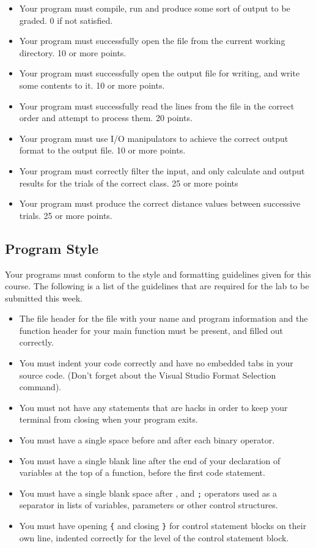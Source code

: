 \documentclass[11pt]{article}
\begin{document}
\begin{itemize}
\item Your program must compile, run and produce some sort of output to be
  graded. 0 if not satisfied.
\item Your program must successfully open the file from the current
  working directory. 10 or more points.
\item Your program must successfully open the output file for writing, and
  write some contents to it.  10 or more points.
\item Your program must successfully read the lines from the file in the
  correct order and attempt to process them. 20 points.
\item Your program must use I/O manipulators to achieve the correct output
  format to the output file.  10 or more points.
\item Your program must correctly filter the input, and only calculate and
  output results for the trials of the correct class.  25 or more points
\item Your program must produce the correct distance values between successive
  trials. 25 or more points.
\end{itemize}
\subsection*{Program Style}
\label{sec-5-2}


Your programs must conform to the style and formatting guidelines given for this course.
The following is a list of the guidelines that are required for the lab to be submitted
this week.

\begin{itemize}
\item The file header for the file with your name and program information
  and the function header for your main function must be present, and
  filled out correctly.
\item You must indent your code correctly and have no embedded tabs in
  your source code. (Don't forget about the Visual Studio Format
  Selection command).
\item You must not have any statements that are hacks in order to keep
  your terminal from closing when your program exits.
\item You must have a single space before and after each binary operator.
\item You must have a single blank line after the end of your declaration
  of variables at the top of a function, before the first code
  statement.
\item You must have a single blank space after , and \verb~;~ operators used as a
  separator in lists of variables, parameters or other control
  structures.
\item You must have opening \verb~{~ and closing \verb~}~ for control statement blocks
  on their own line, indented correctly for the level of the control
  statement block.
\end{itemize}
\end{document}
